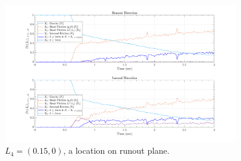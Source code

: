 \documentclass{article}
\begin{document}
\begin{figure}[H]
\centering
	\includegraphics[width=0.9\textwidth]{InclinedPlane/LocalRecords/DominancePr_x4C.png}
	\caption{$L_4=(0.15,0)$, a location on runout plane.}
	\label{fig:Ramp-Prx4C}
\end{figure}
\end{document}
